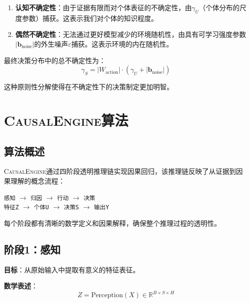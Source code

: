 \documentclass[conference]{IEEEtran}
\newcommand{\causalengine}{\textsc{CausalEngine}}
\newcommand{\reals}{\mathbb{R}}
\begin{document}
\begin{CJK}{UTF8}{gbsn}
\begin{enumerate}
\item \textbf{认知不确定性}：由于证据有限而对个体表征的不确定性，由$\gamma_U$（个体分布的尺度参数）捕获。这表示我们对个体的知识程度。

\item \textbf{偶然不确定性}：无法通过更好模型减少的环境随机性，由具有可学习强度参数$|\mathbf{b}_{\text{noise}}|$的外生噪声$\varepsilon$捕获。这表示环境的内在随机性。
\end{enumerate}

最终决策分布中的总不确定性为：
\begin{equation}
\gamma_S = |W_{\text{action}}| \cdot (\gamma_U + |\mathbf{b}_{\text{noise}}|)
\end{equation}

这种原则性分解使得在不确定性下的决策制定更加明智。

\section{\causalengine{}算法}
\label{sec:algorithm}

\subsection{算法概述}

\causalengine{}通过四阶段透明推理链实现因果回归，该推理链反映了从证据到因果理解的概念流程：

\begin{center}
\texttt{感知} $\rightarrow$ \texttt{归因} $\rightarrow$ \texttt{行动} $\rightarrow$ \texttt{决策}\\
\texttt{特征Z} $\rightarrow$ \texttt{个体U} $\rightarrow$ \texttt{决策S} $\rightarrow$ \texttt{输出Y}
\end{center}

每个阶段都有清晰的数学定义和因果解释，确保整个推理过程的透明性。

\subsection{阶段1：感知}

\textbf{目标}：从原始输入中提取有意义的特征表征。

\textbf{数学表述}：
\begin{equation}
Z = \text{Perception}(X) \in \reals^{B \times S \times H}
\end{equation}


\end{CJK}
\end{document}
